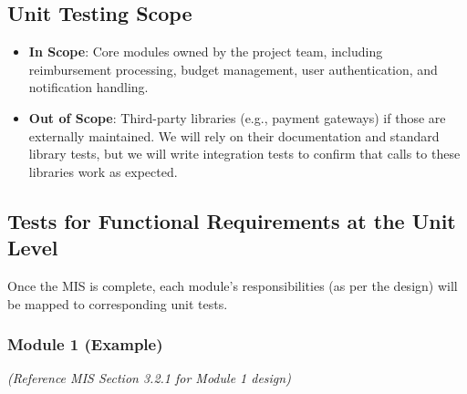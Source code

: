 \documentclass[12pt, titlepage]{article}
\begin{document}
\subsection{Unit Testing Scope}
\begin{itemize}
    \item \textbf{In Scope}: Core modules owned by the project team, including reimbursement processing, budget management, user authentication, and notification handling.
    \item \textbf{Out of Scope}: Third-party libraries (e.g., payment gateways) if those are externally maintained. We will rely on their documentation and standard library tests, but we will write integration tests to confirm that calls to these libraries work as expected.
\end{itemize}

\subsection{Tests for Functional Requirements at the Unit Level}
Once the MIS is complete, each module’s responsibilities (as per the design) will be mapped to corresponding unit tests. 

\subsubsection{Module 1 (Example)}
\textit{(Reference MIS Section 3.2.1 for Module 1 design)}
\end{document}
